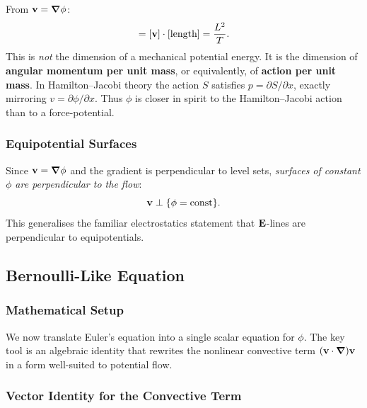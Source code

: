 \documentclass[../main.tex]{subfiles}
\begin{document}
From $\mathbf{v}=\grad\phi$:
\begin{equation}
  [\phi] = [\vel]\cdot[\text{length}] = \frac{L^2}{T}.
  \label{eq:lec15_phi_dim}
\end{equation}
This is \emph{not} the dimension of a mechanical potential energy. It is the dimension of \textbf{angular momentum per unit mass}, or equivalently, of \textbf{action per unit mass}. In Hamilton--Jacobi theory the action $S$ satisfies $p=\partial S/\partial x$, exactly mirroring $v=\partial\phi/\partial x$. Thus $\phi$ is closer in spirit to the Hamilton--Jacobi action than to a force-potential.


\subsubsection{Equipotential Surfaces}

Since $\mathbf{v}=\grad\phi$ and the gradient is perpendicular to level sets, \emph{surfaces of constant $\phi$ are perpendicular to the flow}:
\begin{equation}
  \mathbf{v} \perp \{\phi=\mathrm{const}\}.
  \label{eq:lec15_phi_perp}
\end{equation}
This generalises the familiar electrostatics statement that $\mathbf{E}$-lines are perpendicular to equipotentials.

\subsection{Bernoulli-Like Equation}\label{sec:lec15:bernoulli_like}

\subsubsection*{Mathematical Setup}
We now translate Euler's equation into a single scalar equation for $\phi$. The key tool is an algebraic identity that rewrites the nonlinear convective term $(\mathbf{v}\cdot\grad)\mathbf{v}$ in a form well-suited to potential flow.

\subsubsection{Vector Identity for the Convective Term}
\end{document}
